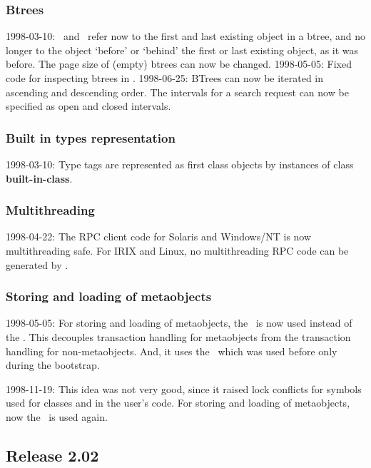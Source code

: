 \subsubsection{Btrees}

1998-03-10: \ and \ 
refer now to the first and last existing object in a btree, and no
longer to the object `before' or `behind' the first or last
existing object, as it was before. The page size of (empty) btrees can
now be changed.  1998-05-05: Fixed code for inspecting btrees in
\lwcl.  1998-06-25: BTrees can now be iterated in ascending and
descending order. The intervals for a search request can now be
specified as open and closed intervals.

\subsubsection{Built in types representation}

1998-03-10: Type tags are represented as first class objects by
instances of class \textbf{built-in-class}.

\subsubsection{Multithreading}

1998-04-22: The RPC client code for Solaris and Windows/NT is now
multithreading safe. For IRIX and Linux, no multithreading RPC code
can be generated by \lisp{rpcgen}.

\subsubsection{Storing and loading of metaobjects}

1998-05-05: For storing and loading of metaobjects, the
\ is now used instead of the
. This decouples transaction handling
for metaobjects from the transaction handling for
non-metaobjects. And, it uses the \ which
was used before only during the bootstrap.

1998-11-19: This idea was not very good, since it raised lock
conflicts for symbols used for classes and in the user's code.  For
storing and loading of metaobjects, now the
\ is used again.

\subsection{Release 2.02}

